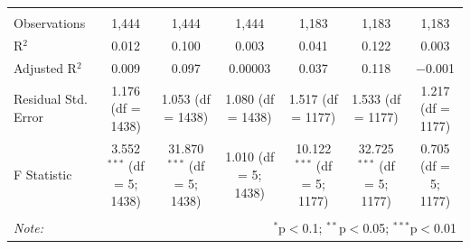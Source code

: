 \documentclass[
]{article}
\begin{document}
\begin{landscape}
\begin{table}[!htbp]
\begin{tabular}{@{\extracolsep{5pt}}lcccccc}
\hline \\[-1.8ex] 
Observations & 1,444 & 1,444 & 1,444 & 1,183 & 1,183 & 1,183 \\ 
R$^{2}$ & 0.012 & 0.100 & 0.003 & 0.041 & 0.122 & 0.003 \\ 
Adjusted R$^{2}$ & 0.009 & 0.097 & 0.00003 & 0.037 & 0.118 & $-$0.001 \\ 
Residual Std. Error & 1.176 (df = 1438) & 1.053 (df = 1438) & 1.080 (df = 1438) & 1.517 (df = 1177) & 1.533 (df = 1177) & 1.217 (df = 1177) \\ 
F Statistic & 3.552$^{***}$ (df = 5; 1438) & 31.870$^{***}$ (df = 5; 1438) & 1.010 (df = 5; 1438) & 10.122$^{***}$ (df = 5; 1177) & 32.725$^{***}$ (df = 5; 1177) & 0.705 (df = 5; 1177) \\ 
\hline 
\hline \\[-1.8ex] 
\textit{Note:}  & \multicolumn{6}{r}{$^{*}$p$<$0.1; $^{**}$p$<$0.05; $^{***}$p$<$0.01} \\ 
\end{tabular} 
\end{table} 
\endgroup

\end{landscape}
\end{document}
